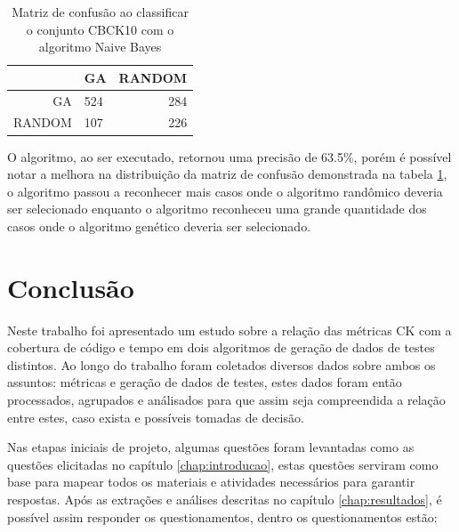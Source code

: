 \documentclass[
	12pt,				%
	oneside,			%
	a4paper,			%
	english,			%
	brazil				%
	]{abntex2ppgsi}
\begin{document}
\begin{table}[h]
\centering
\caption{Matriz de confusão ao classificar o conjunto CBCK10 com o algoritmo Naive Bayes}
\vspace{0.5cm}
\begin{tabular}{r|lr}

										
 & GA & RANDOM \\ %
\hline                               %
GA		& 524		& 284 \\
RANDOM		& 107		& 226
\end{tabular}
\label{table:confusao-hibrido-plus}
\end{table}

O algoritmo, ao ser executado, retornou uma precisão de 63.5\%, porém é possível notar a melhora na distribuição da matriz de confusão demonstrada na tabela \ref{table:confusao-hibrido-plus}, o algoritmo passou a reconhecer mais casos onde o algoritmo randômico deveria ser selecionado enquanto o algoritmo reconheceu uma grande quantidade dos casos onde o algoritmo genético deveria ser selecionado.




\chapter{Conclusão}
\label{chap:conclusao}
Neste trabalho foi apresentado um estudo sobre a relação das métricas CK com a cobertura de código e tempo em dois algoritmos de geração de dados de testes distintos.
Ao longo do trabalho foram coletados diversos dados sobre ambos os assuntos: métricas e geração de dados de testes, estes dados foram então processados, agrupados e análisados para que assim seja compreendida a relação entre estes, caso exista e possíveis tomadas de decisão.

Nas etapas iniciais de projeto, algumas questões foram levantadas como as questões elicitadas no capítulo \ref{chap:introducao}, estas questões serviram como base para mapear todos os materiais e atividades necessários para garantir respostas. Após as  extrações e análises  descritas no capítulo \ref{chap:resultados}, é possível assim responder os questionamentos, dentro os questionamentos estão:\\

\\
\end{document}
